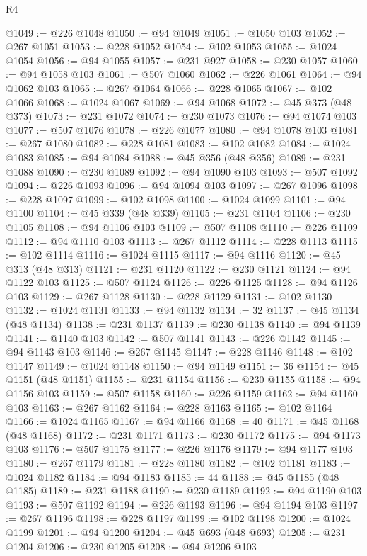 \begin{lexlean}{R4}
\begin{coremodule}
@1049 := @226 @1048
@1050 := @94 @1049
@1051 := @1050 @103
@1052 := @267 @1051
@1053 := @228 @1052
@1054 := @102 @1053
@1055 := @1024 @1054
@1056 := @94 @1055
@1057 := @231 @927
@1058 := @230 @1057
@1060 := @94 @1058 @103
@1061 := @507 @1060
@1062 := @226 @1061
@1064 := @94 @1062 @103
@1065 := @267 @1064
@1066 := @228 @1065
@1067 := @102 @1066
@1068 := @1024 @1067
@1069 := @94 @1068
@1072 := @45 @373 (@48 @373)
@1073 := @231 @1072
@1074 := @230 @1073
@1076 := @94 @1074 @103
@1077 := @507 @1076
@1078 := @226 @1077
@1080 := @94 @1078 @103
@1081 := @267 @1080
@1082 := @228 @1081
@1083 := @102 @1082
@1084 := @1024 @1083
@1085 := @94 @1084
@1088 := @45 @356 (@48 @356)
@1089 := @231 @1088
@1090 := @230 @1089
@1092 := @94 @1090 @103
@1093 := @507 @1092
@1094 := @226 @1093
@1096 := @94 @1094 @103
@1097 := @267 @1096
@1098 := @228 @1097
@1099 := @102 @1098
@1100 := @1024 @1099
@1101 := @94 @1100
@1104 := @45 @339 (@48 @339)
@1105 := @231 @1104
@1106 := @230 @1105
@1108 := @94 @1106 @103
@1109 := @507 @1108
@1110 := @226 @1109
@1112 := @94 @1110 @103
@1113 := @267 @1112
@1114 := @228 @1113
@1115 := @102 @1114
@1116 := @1024 @1115
@1117 := @94 @1116
@1120 := @45 @313 (@48 @313)
@1121 := @231 @1120
@1122 := @230 @1121
@1124 := @94 @1122 @103
@1125 := @507 @1124
@1126 := @226 @1125
@1128 := @94 @1126 @103
@1129 := @267 @1128
@1130 := @228 @1129
@1131 := @102 @1130
@1132 := @1024 @1131
@1133 := @94 @1132
@1134 := 32
@1137 := @45 @1134 (@48 @1134)
@1138 := @231 @1137
@1139 := @230 @1138
@1140 := @94 @1139
@1141 := @1140 @103
@1142 := @507 @1141
@1143 := @226 @1142
@1145 := @94 @1143 @103
@1146 := @267 @1145
@1147 := @228 @1146
@1148 := @102 @1147
@1149 := @1024 @1148
@1150 := @94 @1149
@1151 := 36
@1154 := @45 @1151 (@48 @1151)
@1155 := @231 @1154
@1156 := @230 @1155
@1158 := @94 @1156 @103
@1159 := @507 @1158
@1160 := @226 @1159
@1162 := @94 @1160 @103
@1163 := @267 @1162
@1164 := @228 @1163
@1165 := @102 @1164
@1166 := @1024 @1165
@1167 := @94 @1166
@1168 := 40
@1171 := @45 @1168 (@48 @1168)
@1172 := @231 @1171
@1173 := @230 @1172
@1175 := @94 @1173 @103
@1176 := @507 @1175
@1177 := @226 @1176
@1179 := @94 @1177 @103
@1180 := @267 @1179
@1181 := @228 @1180
@1182 := @102 @1181
@1183 := @1024 @1182
@1184 := @94 @1183
@1185 := 44
@1188 := @45 @1185 (@48 @1185)
@1189 := @231 @1188
@1190 := @230 @1189
@1192 := @94 @1190 @103
@1193 := @507 @1192
@1194 := @226 @1193
@1196 := @94 @1194 @103
@1197 := @267 @1196
@1198 := @228 @1197
@1199 := @102 @1198
@1200 := @1024 @1199
@1201 := @94 @1200
@1204 := @45 @693 (@48 @693)
@1205 := @231 @1204
@1206 := @230 @1205
@1208 := @94 @1206 @103

\end{coremodule}
\end{lexlean}
